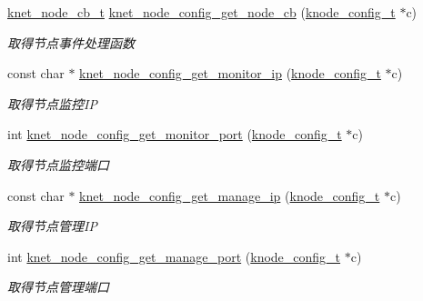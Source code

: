 \begin{DoxyCompactItemize}
\hyperlink{a00066_a09c2d1f8eef7dc82226691ce39b7c4d8_a09c2d1f8eef7dc82226691ce39b7c4d8}{knet\+\_\+node\+\_\+cb\+\_\+t} \hyperlink{a00105_a60db9a0173d2840b8626f617ee79752f_a60db9a0173d2840b8626f617ee79752f}{knet\+\_\+node\+\_\+config\+\_\+get\+\_\+node\+\_\+cb} (\hyperlink{a00066_af1cfaee0eb1c76ebf06076b95cc47ee1_af1cfaee0eb1c76ebf06076b95cc47ee1}{knode\+\_\+config\+\_\+t} $\ast$c)
\begin{DoxyCompactList}\small\item\em 取得节点事件处理函数 \end{DoxyCompactList}\item 
const char $\ast$ \hyperlink{a00105_ae141fc5428abe1ea86d99e7099a06453_ae141fc5428abe1ea86d99e7099a06453}{knet\+\_\+node\+\_\+config\+\_\+get\+\_\+monitor\+\_\+ip} (\hyperlink{a00066_af1cfaee0eb1c76ebf06076b95cc47ee1_af1cfaee0eb1c76ebf06076b95cc47ee1}{knode\+\_\+config\+\_\+t} $\ast$c)
\begin{DoxyCompactList}\small\item\em 取得节点监控\+I\+P \end{DoxyCompactList}\item 
int \hyperlink{a00105_adbb8630f77e7d83d1b9d46012dda7d72_adbb8630f77e7d83d1b9d46012dda7d72}{knet\+\_\+node\+\_\+config\+\_\+get\+\_\+monitor\+\_\+port} (\hyperlink{a00066_af1cfaee0eb1c76ebf06076b95cc47ee1_af1cfaee0eb1c76ebf06076b95cc47ee1}{knode\+\_\+config\+\_\+t} $\ast$c)
\begin{DoxyCompactList}\small\item\em 取得节点监控端口 \end{DoxyCompactList}\item 
const char $\ast$ \hyperlink{a00105_a985f7a44724e41240b9ae33e44f52eb7_a985f7a44724e41240b9ae33e44f52eb7}{knet\+\_\+node\+\_\+config\+\_\+get\+\_\+manage\+\_\+ip} (\hyperlink{a00066_af1cfaee0eb1c76ebf06076b95cc47ee1_af1cfaee0eb1c76ebf06076b95cc47ee1}{knode\+\_\+config\+\_\+t} $\ast$c)
\begin{DoxyCompactList}\small\item\em 取得节点管理\+I\+P \end{DoxyCompactList}\item 
int \hyperlink{a00105_a64c20eeea8d7ccbe8cd9a31211caddc6_a64c20eeea8d7ccbe8cd9a31211caddc6}{knet\+\_\+node\+\_\+config\+\_\+get\+\_\+manage\+\_\+port} (\hyperlink{a00066_af1cfaee0eb1c76ebf06076b95cc47ee1_af1cfaee0eb1c76ebf06076b95cc47ee1}{knode\+\_\+config\+\_\+t} $\ast$c)
\begin{DoxyCompactList}\small\item\em 取得节点管理端口 \end{DoxyCompactList}\item 

\end{DoxyCompactItemize}
